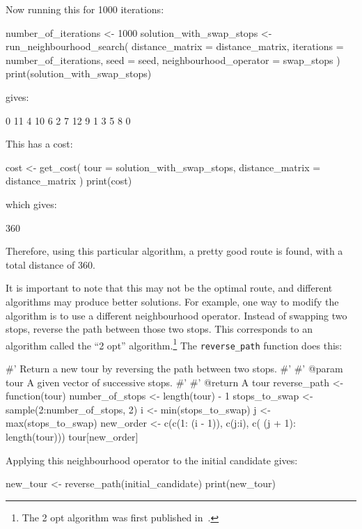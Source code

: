 Now running this for 1000 iterations:

\begin{Rin}
number_of_iterations <- 1000
solution_with_swap_stops <- run_neighbourhood_search(
  distance_matrix = distance_matrix,
  iterations = number_of_iterations,
  seed = seed,
  neighbourhood_operator = swap_stops
)
print(solution_with_swap_stops)
\end{Rin}

gives:

\begin{Rout}
 [1]  0 11  4 10  6  2  7 12  9  1  3  5  8  0
\end{Rout}

This has a cost:

\begin{Rin}
cost <- get_cost(
  tour = solution_with_swap_stops,
  distance_matrix = distance_matrix
)
print(cost)
\end{Rin}

which gives:

\begin{Rout}
[1] 360
\end{Rout}

Therefore, using this particular algorithm, a pretty good route is found, with a
total distance of 360.

It is important to note that this may not be the optimal route, and different algorithms
 may produce better solutions.
For example, one way to modify the algorithm is to use a different neighbourhood operator.
Instead of swapping two stops, reverse the path between those two
stops. This corresponds to an algorithm called the ``2 opt''
algorithm.\footnote{The 2 opt algorithm was first published in~\cite{croes1958method}.}
The \texttt{reverse_path} function does this:


\begin{Rin}
#' Return a new tour by reversing the path between two stops.
#'
#' @param tour A given vector of successive stops.
#'
#' @return A tour
reverse_path <- function(tour){
  number_of_stops <- length(tour) - 1
  stops_to_swap <- sample(2:number_of_stops, 2)
  i <- min(stops_to_swap)
  j <- max(stops_to_swap)
  new_order <- c(c(1: (i - 1)), c(j:i), c( (j + 1): length(tour)))
  tour[new_order]
}
\end{Rin}

Applying this neighbourhood operator to the initial candidate gives:

\begin{Rin}
new_tour <- reverse_path(initial_candidate)
print(new_tour)
\end{Rin}


